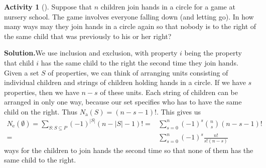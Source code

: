 \documentclass[10pt,]{book}
\theoremstyle{plain}
\theoremstyle{definition}
\newtheorem{activity}[project]{Activity}
\numberwithin{equation}{chapter}
\newcommand{\amp}{&}
\begin{document}
\begin{activity}[]\label{activity-230}
Suppose that \(n\) children join hands in a circle for a game at nursery school. The game involves everyone falling down (and letting go). In how many ways may they join hands in a circle again so that nobody is to the right of the same child that was previously to his or her right?%
\par\medskip\noindent%
\textbf{Solution.}\quad We use inclusion and exclusion, with property \(i\) being the property that child \(i\) has the same child to the right the second time they join hands.  Given a set \(S\) of properties, we can think of arranging units consisting of individual children and strings of children holding hands in a circle. If we have \(s\) properties, then we have \(n-s\) of these units. Each string of children can be arranged in only one way, because our set specifies who has to have the same child on the right. Thus \(N_{\mbox{a} }(S) = (n-s-1)!\). This gives us%
\begin{align*}
N_{\mbox{e} }(\emptyset)=\sum_{S:S\subseteq P}
(-1)^{|S|}(n-|S|-1)! =\amp 
\sum_{s=0}^n (-1)^s \binom{n}{s} (n-s-1)!\\
=\amp \sum_{s=0}^n (-1)^s \frac{n!}{s!(n-s)}
\end{align*}
ways for the children to join hands the second time so that none of them has the same child to the right.%
\end{activity}
\end{document}
